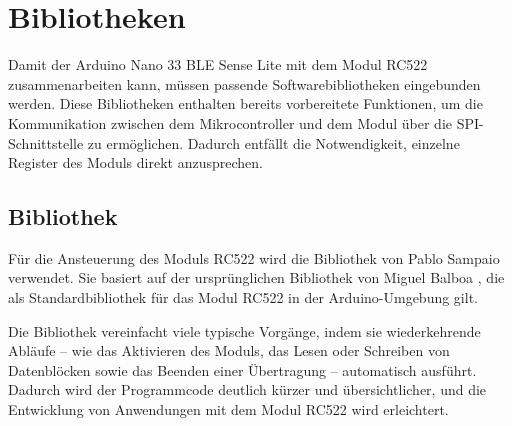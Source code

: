 %
%
%
%













\section{Bibliotheken}



Damit der Arduino Nano 33 BLE Sense Lite mit dem Modul RC522 zusammenarbeiten kann, 
müssen passende Softwarebibliotheken eingebunden werden. 
Diese Bibliotheken enthalten bereits vorbereitete Funktionen, 
um die Kommunikation zwischen dem Mikrocontroller und dem Modul über die SPI-Schnittstelle zu ermöglichen. 
Dadurch entfällt die Notwendigkeit, einzelne Register des Moduls direkt anzusprechen.


\subsection{Bibliothek }

Für die Ansteuerung des Moduls RC522 wird die Bibliothek  
von Pablo Sampaio \cite{Sampaio:2025} verwendet. 
Sie basiert auf der ursprünglichen Bibliothek  von Miguel Balboa \cite{Balboa:2025}, 
die als Standardbibliothek für das Modul RC522 in der Arduino-Umgebung gilt. 

Die Bibliothek  vereinfacht viele typische Vorgänge, 
indem sie wiederkehrende Abläufe – wie das Aktivieren des Moduls, 
das Lesen oder Schreiben von Datenblöcken sowie das Beenden einer Übertragung – automatisch ausführt. 
Dadurch wird der Programmcode deutlich kürzer und übersichtlicher, 
und die Entwicklung von Anwendungen mit dem Modul RC522 wird erleichtert. 

